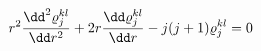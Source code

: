 \begin{equation}
r^2{\dd^2\varrho^{kl}_j\over\dd r^2}+2r{\dd\varrho^{kl}_j\over\dd
r}-j(j+1)\varrho^{kl}_j=0
\label{radial1}
\end{equation}

